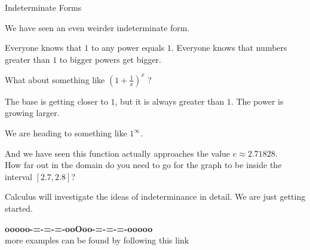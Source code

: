 \documentclass{ximera}
\begin{document}
\begin{example} Indeterminate Forms

We have seen an even weirder indeterminate form.

Everyone knows that $1$ to any power equals $1$. Everyone knows that numbers greater than $1$ to bigger powers get bigger.


What about something like $\left( 1 + \frac{1}{x} \right)^x$ ?

The base is getting closer to $1$, but it is always greater than $1$.  The power is growing larger.  

We are heading to something like $1^{\infty}$.

And we have seen this function actually approaches the value $e \approx 2.71828$. \\

How far out in the domain do you need to go for the graph to be inside the interval $[2.7, 2.8]$?








\begin{center}
\end{center}









\end{example}



Calculus will investigate the ideas of indeterminance in detail.  We are just getting started.










\begin{center}
\textbf{\textcolor{green!50!black}{ooooo-=-=-=-ooOoo-=-=-=-ooooo}} \\

more examples can be found by following this link\\ 

\end{center}
\end{document}
